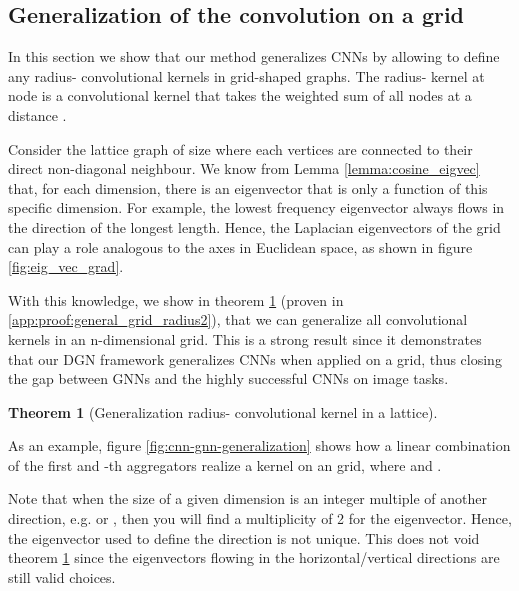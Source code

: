 \documentclass{article} \usepackage{arxiv,times}
\newtheorem{theorem}{Theorem}[section]
\begin{document}
\subsection{Generalization of the convolution on a grid} \label{sec:generalization_cnn}

In this section we show that our method generalizes CNNs by allowing to define any radius- convolutional kernels in grid-shaped graphs. The radius- kernel at node  is a convolutional kernel that takes the weighted sum of all nodes  at a distance .

Consider the lattice graph  of size  where each vertices are connected to their direct non-diagonal neighbour. We know from Lemma \ref{lemma:cosine_eigvec} that, for each dimension, there is an eigenvector that is only a function of this specific dimension. For example, the lowest frequency eigenvector  always flows in the direction of the longest length. Hence, the Laplacian eigenvectors of the grid can play a role analogous to the axes in Euclidean space, as shown in figure \ref{fig:eig_vec_grad}. 

With this knowledge, we show in theorem \ref{th:general_grid_radius2} (proven in \ref{app:proof:general_grid_radius2}), that we can generalize all convolutional kernels in an n-dimensional grid.
This is a strong result since it demonstrates that our DGN framework generalizes CNNs when applied on a grid, thus closing the gap between GNNs and the highly successful CNNs on image tasks.


\begin{theorem}[Generalization radius- convolutional kernel in a lattice]
\label{th:general_grid_radius2}
\end{theorem}


As an example, figure \ref{fig:cnn-gnn-generalization} shows how a linear combination of the first and -th aggregators  realize a kernel on an  grid, where  and .

Note that when the size of a given dimension is an integer multiple of another direction, e.g.  or , then you will find a multiplicity of 2 for the  eigenvector. Hence, the eigenvector used to define the direction is not unique. This does not void theorem \ref{th:general_grid_radius2} since the eigenvectors flowing in the horizontal/vertical directions are still valid choices.
\end{document}
